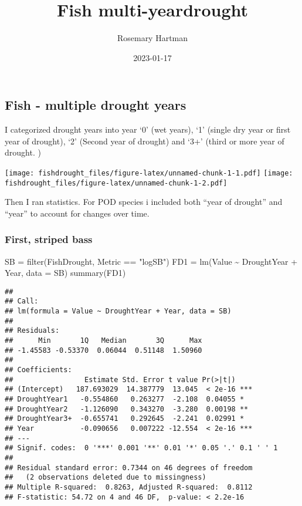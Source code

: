 \documentclass[
]{article}
\title{Fish multi-yeardrought}
\author{Rosemary Hartman}
\date{2023-01-17}
\newenvironment{Shaded}{\begin{snugshade}}{\end{snugshade}}
\newcommand{\AttributeTok}[1]{\textcolor[rgb]{0.77,0.63,0.00}{#1}}
\newcommand{\FunctionTok}[1]{\textcolor[rgb]{0.00,0.00,0.00}{#1}}
\newcommand{\NormalTok}[1]{#1}
\newcommand{\OtherTok}[1]{\textcolor[rgb]{0.56,0.35,0.01}{#1}}
\newcommand{\SpecialCharTok}[1]{\textcolor[rgb]{0.00,0.00,0.00}{#1}}
\newcommand{\StringTok}[1]{\textcolor[rgb]{0.31,0.60,0.02}{#1}}
\begin{document}
\maketitle

\hypertarget{fish---multiple-drought-years}{%
\subsection{Fish - multiple drought
years}\label{fish---multiple-drought-years}}

I categorized drought years into year `0' (wet years), `1' (single dry
year or first year of drought), `2' (Second year of drought) and `3+'
(third or more year of drought. )

\texttt{[image: fishdrought\_files/figure-latex/unnamed-chunk-1-1.pdf]}
\texttt{[image: fishdrought\_files/figure-latex/unnamed-chunk-1-2.pdf]}

Then I ran statistics. For POD species i included both ``year of
drought'' and ``year'' to account for changes over time.

\hypertarget{first-striped-bass}{%
\subsubsection{First, striped bass}\label{first-striped-bass}}

\begin{Shaded}
\begin{Highlighting}[]
\NormalTok{SB }\OtherTok{=} \FunctionTok{filter}\NormalTok{(FishDrought, Metric }\SpecialCharTok{==} \StringTok{"logSB"}\NormalTok{)}
\NormalTok{FD1 }\OtherTok{=} \FunctionTok{lm}\NormalTok{(Value }\SpecialCharTok{\textasciitilde{}}\NormalTok{ DroughtYear }\SpecialCharTok{+}\NormalTok{ Year, }\AttributeTok{data =}\NormalTok{ SB)}
\FunctionTok{summary}\NormalTok{(FD1)}
\end{Highlighting}
\end{Shaded}

\begin{verbatim}
## 
## Call:
## lm(formula = Value ~ DroughtYear + Year, data = SB)
## 
## Residuals:
##      Min       1Q   Median       3Q      Max 
## -1.45583 -0.53370  0.06044  0.51148  1.50960 
## 
## Coefficients:
##                 Estimate Std. Error t value Pr(>|t|)    
## (Intercept)   187.693029  14.387779  13.045  < 2e-16 ***
## DroughtYear1   -0.554860   0.263277  -2.108  0.04055 *  
## DroughtYear2   -1.126090   0.343270  -3.280  0.00198 ** 
## DroughtYear3+  -0.655741   0.292645  -2.241  0.02991 *  
## Year           -0.090656   0.007222 -12.554  < 2e-16 ***
## ---
## Signif. codes:  0 '***' 0.001 '**' 0.01 '*' 0.05 '.' 0.1 ' ' 1
## 
## Residual standard error: 0.7344 on 46 degrees of freedom
##   (2 observations deleted due to missingness)
## Multiple R-squared:  0.8263, Adjusted R-squared:  0.8112 
## F-statistic: 54.72 on 4 and 46 DF,  p-value: < 2.2e-16
\end{verbatim}
\end{document}
